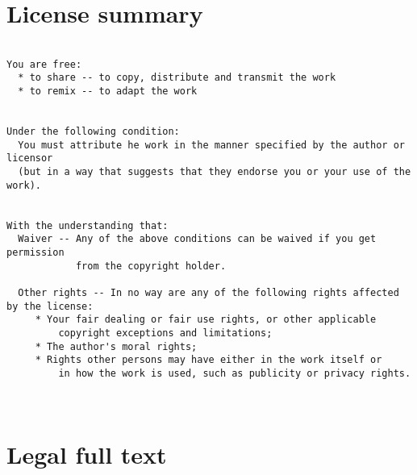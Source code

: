 \section{License summary}

\begin{verbatim}

You are free:
  * to share -- to copy, distribute and transmit the work
  * to remix -- to adapt the work


Under the following condition:
  You must attribute he work in the manner specified by the author or licensor
  (but in a way that suggests that they endorse you or your use of the work).


With the understanding that:
  Waiver -- Any of the above conditions can be waived if you get permission
            from the copyright holder.
  
  Other rights -- In no way are any of the following rights affected by the license:
     * Your fair dealing or fair use rights, or other applicable 
         copyright exceptions and limitations;
     * The author's moral rights;
     * Rights other persons may have either in the work itself or
         in how the work is used, such as publicity or privacy rights.



\end{verbatim}



\section{Legal full text}

